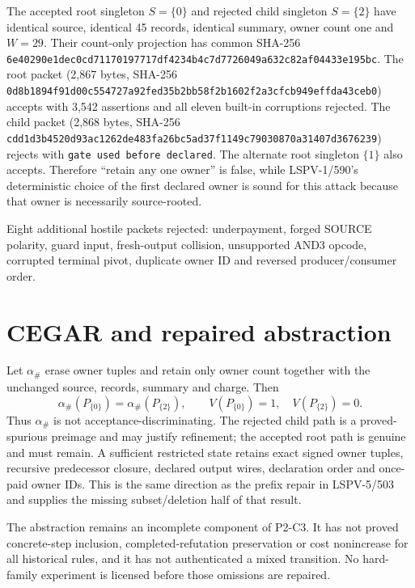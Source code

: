\documentclass[11pt]{article}
\begin{document}
The accepted root singleton \(S=\{0\}\) and rejected child singleton \(S=\{2\}\) have identical source, identical 45 records, identical summary, owner count one and \(W=29\).  Their count-only projection has common SHA-256
\texttt{6e40290e1dec0cd71170197717df4234b4c7d7726049a632c82af04433e195bc}.
The root packet (2,867 bytes, SHA-256 \texttt{0d8b1894f91d00c554727a92fed35b2bb58f2b1602f2a3cfcb949effda43ceb0}) accepts with 3,542 assertions and all eleven built-in corruptions rejected.  The child packet (2,868 bytes, SHA-256 \texttt{cdd1d3b4520d93ac1262de483fa26bc5ad37f1149c79030870a31407d3676239}) rejects with \texttt{gate used before declared}.  The alternate root singleton \(\{1\}\) also accepts.  Therefore ``retain any one owner'' is false, while LSPV-1/590's deterministic choice of the first declared owner is sound for this attack because that owner is necessarily source-rooted.

Eight additional hostile packets rejected: underpayment, forged SOURCE polarity, guard input, fresh-output collision, unsupported AND3 opcode, corrupted terminal pivot, duplicate owner ID and reversed producer/consumer order.

\section*{CEGAR and repaired abstraction}
Let \(\alpha_{\#}\) erase owner tuples and retain only owner count together with the unchanged source, records, summary and charge.  Then
\[
 \alpha_{\#}(P_{\{0\}})=\alpha_{\#}(P_{\{2\}}),
 \qquad V(P_{\{0\}})=1,\quad V(P_{\{2\}})=0.
\]
Thus \(\alpha_{\#}\) is not acceptance-discriminating.  The rejected child path is a proved-spurious preimage and may justify refinement; the accepted root path is genuine and must remain.  A sufficient restricted state retains exact signed owner tuples, recursive predecessor closure, declared output wires, declaration order and once-paid owner IDs.  This is the same direction as the prefix repair in LSPV-5/503 and supplies the missing subset/deletion half of that result.

The abstraction remains an incomplete component of P2-C3.  It has not proved concrete-step inclusion, completed-refutation preservation or cost nonincrease for all historical rules, and it has not authenticated a mixed transition.  No hard-family experiment is licensed before those omissions are repaired.
\end{document}
